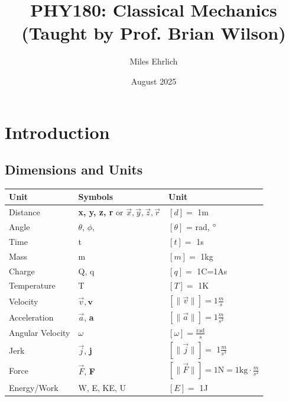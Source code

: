 \documentclass{article}
\title{PHY180: Classical Mechanics (Taught by Prof. Brian Wilson)}
\author{Miles Ehrlich}
\date{August 2025}
\begin{document}
\newcommand{\intg}[2]{\int\limits_{#1}^{#2}}

\newcommand{\dif}[2]{\frac{d{#1}}{d{#2}}}
\newcommand{\prt}[2]{\frac{d {#1}}{d {#2}}}
\newcommand{\sig}{\sum \limits_{i=1}^{n}}
\maketitle
\tableofcontents
\pagebreak
\section{Introduction}

\subsection{Dimensions and Units}
\begin{center}
\begin{tabular}{|m{4cm}|m{4cm}|m{4cm}|}
     \hline
     Unit & Symbols & Unit\\[2ex]
     \hline
     Distance & \textbf{x, y, z, r} or $\vec{x}, \vec{y}, \vec{z}, \vec{r}$ & $\left[d \right]=$ 1m\\[2ex]
     \hline 
     Angle & $\theta$, $\phi$, & $\left[ \theta \right]$ = rad, $\degree$\\[2ex]
     \hline
     Time & t&$\left[t \right]=$ 1s\\[2ex]
     \hline
     Mass & m & $\left[m \right]=$ 1kg\\[2ex]
     \hline
     Charge & Q, q& $\left[q \right]=$ 1C=1As  \\[2ex]
     \hline
     Temperature & T & $\left[T \right]=$ 1K \\[2ex]
     \hline 
     Velocity & $\vec{v}, \textbf{v}$& $\left[\| \vec{v} \|\right]=1\frac{m}{s}$\\[2ex]
     \hline 
     Acceleration & $\vec{a}$, \textbf{a} & $\left[\| \vec{a} \|\right]=1\frac{m}{s^2}$\\[2ex]
     \hline 
     Angular Velocity & $\omega$ & $\left[ \omega \right] = \frac{\text{rad}}{s}$\\[2ex]
     \hline
     Jerk & $\vec{j}$, \textbf{j} & $\left[ \| \vec{j} \| \right]=$ 1$\frac{m}{s^3}$ \\[2ex]
     \hline
     Force & $\vec{F}$, \textbf{F} & $\left[\| \vec{F} \| \right]= 1\text{N} = \text{1kg}\cdot \frac{m}{s^2}$ \\[2ex]
     \hline 
     Energy/Work & W, E, KE, U & $\left[E \right]=$ 1J \\[2ex]
     \hline
     
\end{tabular}
\end{center}
\end{document}
